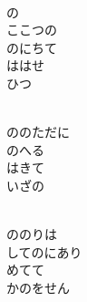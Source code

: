 \documentclass[10pt,b5j]{tarticle} %
\begin{document}
\vspace{1.5em} %
\newcommand{\linespace}{0.5em} %
\newcommand{\blocksize}{0.5\hsize} %
\newcommand{\itemmargin}{3em} %
\begin{enumerate} %
    \setlength{\itemindent}{\itemmargin} %
    \begin{minipage}[c]{\blocksize}
    
        \vspace{\linespace}
        \item~\\
        の\\
        ここつの\\
        のにちて\\
        ははせ\\
        ひつ
        
    \end{minipage}
    \begin{minipage}[c]{\blocksize}
        
        \vspace{\linespace}
        \item~\\
        ののただに\\
        のへる\\
        はきて\\
        いざの
        
    \end{minipage}
    \begin{minipage}[c]{\blocksize}
        
        \vspace{\linespace}
        \item~\\
        ののりは\\
        してのにあり\\
        めてて\\
        かのをせん
        

\end{minipage}
\end{enumerate}
\end{document}
